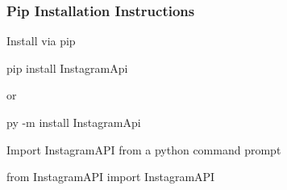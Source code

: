 \subsubsection*{Pip Installation Instructions}


\begin{DoxyEnumerate}
\item Install via pip

{\ttfamily pip install Instagram\+Api}

or

{\ttfamily py -\/m install Instagram\+Api}
\item Import Instagram\+A\+PI from a python command prompt

{\ttfamily from Instagram\+A\+PI import Instagram\+A\+PI} 
\end{DoxyEnumerate}
